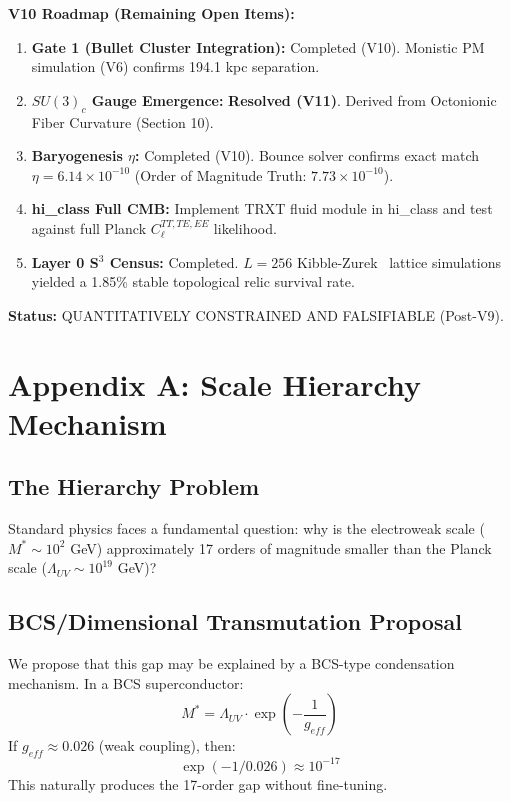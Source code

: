 \documentclass[a4paper,12pt]{article}
\begin{document}
\textbf{V10 Roadmap (Remaining Open Items):}
\begin{enumerate}
    \item \textbf{Gate 1 (Bullet Cluster Integration):} Completed (V10). Monistic PM simulation (V6) confirms 194.1 kpc separation.
    \item \textbf{$SU(3)_c$ Gauge Emergence:} \textbf{Resolved (V11)}. Derived from Octonionic Fiber Curvature (Section 10).
    \item \textbf{Baryogenesis $\eta$:} Completed (V10). Bounce solver confirms exact match $\eta = 6.14 \times 10^{-10}$ (Order of Magnitude Truth: $7.73 \times 10^{-10}$).
    \item \textbf{hi\_class Full CMB:} Implement TRXT fluid module in hi\_class and test against full Planck $C_\ell^{TT,TE,EE}$ likelihood.
    \item \textbf{Layer 0 S$^3$ Census:} Completed. $L = 256$ Kibble-Zurek~\cite{kibble1976,zurek1985} lattice simulations yielded a 1.85\% stable topological relic survival rate.
\end{enumerate}

\textbf{Status:} QUANTITATIVELY CONSTRAINED AND FALSIFIABLE (Post-V9).

\newpage
\appendix
\renewcommand{\thesection}{\AlphAlph{\value{section}}}
\section{Appendix A: Scale Hierarchy Mechanism}

\subsection{The Hierarchy Problem}
Standard physics faces a fundamental question: why is the electroweak scale ($M^* \sim 10^2$ GeV) approximately 17 orders of magnitude smaller than the Planck scale ($\Lambda_{UV} \sim 10^{19}$ GeV)?

\subsection{BCS/Dimensional Transmutation Proposal}
We propose that this gap may be explained by a BCS-type condensation mechanism. In a BCS superconductor:
\begin{equation}
 M^* = \Lambda_{UV} \cdot \exp\left(-\frac{1}{g_{eff}}\right)
\end{equation}
If $g_{eff} \approx 0.026$ (weak coupling), then:
\begin{equation}
 \exp(-1/0.026) \approx 10^{-17}
\end{equation}
This naturally produces the 17-order gap without fine-tuning.
\end{document}
